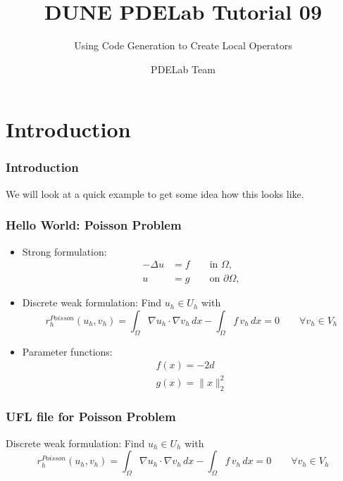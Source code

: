\documentclass[aspectratio=169,11pt]{beamer}
\title{DUNE PDELab Tutorial 09}
\subtitle{Using Code Generation to Create Local Operators}
\author{PDELab Team}
\institute[]
{
  IWR\\
  Heidelberg University
}
\theoremstyle{definition}
\begin{document}

\section{Introduction}

\begin{frame}
  \frametitle{Introduction}
  We will look at a quick example to get some idea how this looks like.
\end{frame}

\begin{frame}
  \frametitle{Hello World: Poisson Problem}

  \begin{itemize}
  \item Strong formulation:
    \begin{align*}
      -\Delta u & = f \qquad\text{in $\Omega$}, \\
      u &= g \qquad\text{on $\partial\Omega$},
    \end{align*}
  \item Discrete weak formulation: Find $u_h \in U_h$ with
    \begin{equation*}
      r_h^{Poisson}(u_h, v_h) = \int_\Omega \nabla u_h \cdot \nabla v_h \, dx
      - \int_\Omega f \, v_h \, dx = 0 \qquad \forall v_h \in V_h
    \end{equation*}
  \item Parameter functions:
    \begin{align*}
      f(x) = -2d \\
      g(x) = \| x \|_2^2
    \end{align*}
  \end{itemize}
\end{frame}

\begin{frame}
  \frametitle{UFL file for Poisson Problem}

  Discrete weak formulation: Find $u_h \in U_h$ with
  \begin{equation*}
    r_h^{Poisson}(u_h, v_h) = \int_\Omega \nabla u_h \cdot \nabla v_h \, dx
    - \int_\Omega f \, v_h \, dx = 0 \qquad \forall v_h \in V_h
  \end{equation*}
  
\end{frame}
\end{document}
